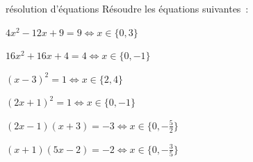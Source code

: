 \begin{exercice}{}{résolution d'équations}
    Résoudre les équations suivantes~:
    \begin{enumeratebf}
        \item $4x^2 - 12x + 9 = 9 \iff x\in\{0, 3\}$
        \item $16x^2 + 16x + 4 = 4 \iff x \in \{0, -1\}$
        \item $(x-3)^2 = 1 \iff x \in \{2, 4\}$
        \item $(2x+1)^2 = 1 \iff x \in \{0, -1\}$
        \item $(2x-1)(x+3) = -3 \iff x \in \{0, -\frac{5}{2}\}$
        \item $(x+1)(5x-2) = -2 \iff x \in \{0, -\frac{3}{5}\}$
    \end{enumeratebf}
\end{exercice}

